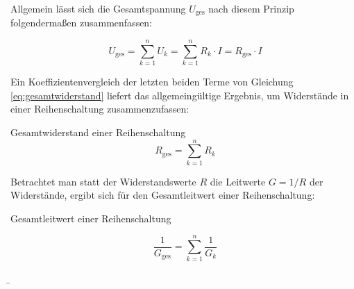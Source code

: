 \begin{frame}
{		Allgemein lässt sich die Gesamtspannung $U_\mathrm{ges}$ nach diesem Prinzip folgendermaßen zusammenfassen:

		\begin{equation}
			U_\mathrm{ges} = \sum_{k=1}^{n} U_k = \sum_{k=1}^{n} R_k \cdot I = R_\mathrm{ges} \cdot I
			\label{eq:gesamtwiderstand}
		\end{equation}

		Ein Koeffizientenvergleich der letzten beiden Terme von Gleichung \ref{eq:gesamtwiderstand} liefert das allgemeingültige
		Ergebnis, um Widerstände in einer Reihenschaltung zusammenzufassen:

		\begin{Merksatz}{Gesamtwiderstand einer Reihenschaltung}{}
			\begin{equation}
				R_\mathrm{ges} = \sum_{k=1}^{n} R_k
			\end{equation}
		\end{Merksatz}

		Betrachtet man statt der Widerstandswerte $R$ die Leitwerte $G = 1/R$ der Widerstände, ergibt sich für den Gesamtleitwert
		einer Reihenschaltung:


		\begin{Merksatz}{Gesamtleitwert einer Reihenschaltung}{}


			\begin{equation}
				\frac{1}{G_\mathrm{ges}} = \sum_{k=1}^{n} \frac{1}{G_k}
			\end{equation}




		\end{Merksatz}












	}

	\b{

		\begin{columns}




\end{columns}}
\end{frame}
